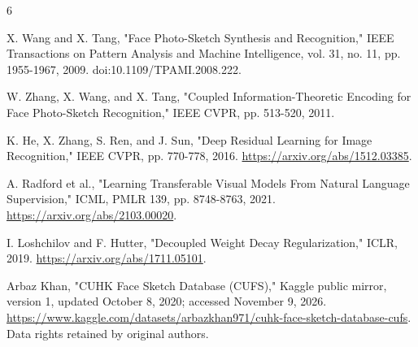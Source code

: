 \documentclass[cameraready]{ieeeconf}
\begin{document}
\begin{thebibliography}{6}

 X. Wang and X. Tang, "Face Photo-Sketch Synthesis and Recognition," IEEE Transactions on Pattern Analysis and Machine Intelligence, vol. 31, no. 11, pp. 1955-1967, 2009. doi:10.1109/TPAMI.2008.222.

 W. Zhang, X. Wang, and X. Tang, "Coupled Information-Theoretic Encoding for Face Photo-Sketch Recognition," IEEE CVPR, pp. 513-520, 2011.

 K. He, X. Zhang, S. Ren, and J. Sun, "Deep Residual Learning for Image Recognition," IEEE CVPR, pp. 770-778, 2016. \url{https://arxiv.org/abs/1512.03385}.

 A. Radford et al., "Learning Transferable Visual Models From Natural Language Supervision," ICML, PMLR 139, pp. 8748-8763, 2021. \url{https://arxiv.org/abs/2103.00020}.

 I. Loshchilov and F. Hutter, "Decoupled Weight Decay Regularization," ICLR, 2019. \url{https://arxiv.org/abs/1711.05101}.

 Arbaz Khan, "CUHK Face Sketch Database (CUFS)," Kaggle public mirror, version 1, updated October 8, 2020; accessed November 9, 2026. \url{https://www.kaggle.com/datasets/arbazkhan971/cuhk-face-sketch-database-cufs}. Data rights retained by original authors.

\end{thebibliography}
\end{document}

